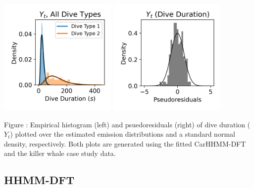 \documentclass{article}
\begin{document}
        \begin{center}
        \includegraphics[width=2.25in]{../Plots/2019/20190902-182840-CATs_OB_1_0_267_CarHHMM2_empirical_hist_dive_duration.png}
        \includegraphics[width=2.25in]{../Plots/2019/20190902-182840-CATs_OB_1_0_267_CarHHMM2_pseudresids_Dive_Duration.png}
        \end{center}
        
        \noindent Figure : Empirical histogram (left) and psuedoresiduals (right) of dive duration ($Y_{t}$) plotted over the estimated emission distributions and a standard normal density, respectively. Both plots are generated using the fitted CarHHMM-DFT and the killer whale case study data.
        \addtocounter{fignum}{1}
        
        \subsection{HHMM-DFT}
        
\end{document}
